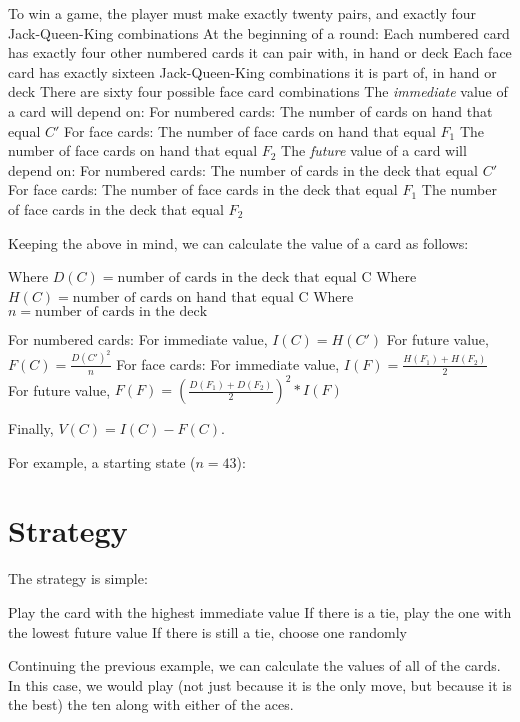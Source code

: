 \documentclass{article}
\begin{document}
\begin{outline}
  \1 To win a game, the player must make exactly twenty pairs, and exactly four Jack-Queen-King combinations
  \1 At the beginning of a round:
    \2 Each numbered card has exactly four other numbered cards it can pair with, in hand or deck
    \2 Each face card has exactly sixteen Jack-Queen-King combinations it is part of, in hand or deck
    \2 There are sixty four possible face card combinations
  \1 The \emph{immediate} value of a card will depend on:
    \2 For numbered cards:
      \3 The number of cards on hand that equal $C'$
    \2 For face cards:
      \3 The number of face cards on hand that equal $F_1$
      \3 The number of face cards on hand that equal $F_2$
  \1 The \emph{future} value of a card will depend on:
    \2 For numbered cards:
      \3 The number of cards in the deck that equal $C'$
    \2 For face cards:
      \3 The number of face cards in the deck that equal $F_1$
      \3 The number of face cards in the deck that equal $F_2$
\end{outline}

Keeping the above in mind, we can calculate the value of a card as follows:

\begin{outline}
  \1 Where $D(C) = \text{number of cards in the deck that equal C}$
  \1 Where $H(C) = \text{number of cards on hand that equal C}$
  \1 Where $n = \text{number of cards in the deck}$
\end{outline}

\begin{outline}
  \1 For numbered cards:
    \2 For immediate value, $I(C) = H(C')$
    \2 For future value, $F(C) = \frac{D(C')^2}{n}$
  \1 For face cards:
    \2 For immediate value, $I(F) = \frac{H(F_1) + H(F_2)}{2}$
    \2 For future value, $F(F) = (\frac{D(F_1) + D(F_2)}{2})^2 * I(F)$
\end{outline}

Finally, $V(C) = I(C) - F(C)$.

For example, a starting state ($n = 43$):

\vspace{3mm}


\section{Strategy}

The strategy is simple:

\begin{outline}
  \1 Play the card with the highest immediate value
    \2 If there is a tie, play the one with the lowest future value
      \3 If there is still a tie, choose one randomly
\end{outline}

Continuing the previous example, we can calculate the values of all of the cards. In this case, we would play (not just because it is the only move, but because it is the best) the ten along with either of the aces.
\end{document}
